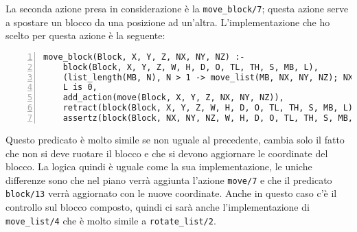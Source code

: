 La seconda azione presa in considerazione è la \verb+move_block/7+; questa azione serve a spostare un blocco da una posizione ad un'altra. L'implementazione che ho scelto per questa azione è la seguente:
\begin{lstlisting}[numbers=left]
move_block(Block, X, Y, Z, NX, NY, NZ) :-
    block(Block, X, Y, Z, W, H, D, O, TL, TH, S, MB, L),
    (list_length(MB, N), N > 1 -> move_list(MB, NX, NY, NZ); NX = NX, NY = NY, NZ = NZ),
    L is 0,
    add_action(move(Block, X, Y, Z, NX, NY, NZ)),
    retract(block(Block, X, Y, Z, W, H, D, O, TL, TH, S, MB, L)),
    assertz(block(Block, NX, NY, NZ, W, H, D, O, TL, TH, S, MB, L)).
\end{lstlisting}
Questo predicato è molto simile se non uguale al precedente, cambia solo il fatto che non si deve ruotare il blocco e che si devono aggiornare le coordinate del blocco. La logica quindi è uguale come la sua implementazione, le uniche differenze sono che nel piano verrà aggiunta l'azione \verb+move/7+ e che il predicato \verb+block/13+ verrà aggiornato con le nuove coordinate. Anche in questo caso c'è il controllo sul blocco composto, quindi ci sarà anche l'implementazione di \verb+move_list/4+ che è molto simile a \verb+rotate_list/2+.

